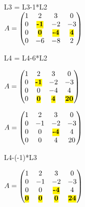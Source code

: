 \vspace{5mm} %

L3 = L3-1*L2 \\

$
A =
\begin{pmatrix}
  1 & 2 & 3 & 0    \\
  0 & \hl{\textbf{-1}} & -2 & -3 \\
  0 & \hl{\textbf{0}} & \hl{\textbf{-4}} & \hl{\textbf{4}}   \\
  0 & -6 & -8 & 2  \\
\end{pmatrix}
$

\vspace{5mm} %

L4 = L4-6*L2 \\

\vspace{5mm} %

$
A =
\begin{pmatrix}
  1 & 2 & 3 & 0    \\
  0 & \hl{\textbf{-1}} & -2 & -3 \\
  0 & 0 & -4 & 4   \\
  0 & \hl{\textbf{0}} & \hl{\textbf{4}} & \hl{\textbf{20}}   \\
\end{pmatrix}
$

\vspace{5mm} %

$
A =
\begin{pmatrix}
  1 & 2 & 3 & 0    \\
  0 & -1 & -2 & -3 \\
  0 & 0 & \hl{\textbf{-4}} & 4   \\
  0 & 0 & 4 & 20  \\
\end{pmatrix}
$

\vspace{5mm} %

L4-(-1)*L3\\

\vspace{5mm} %

$
A =
\begin{pmatrix}
  1 & 2 & 3 & 0    \\
  0 & -1 & -2 & -3 \\
  0 & 0 & \hl{\textbf{-4}} & 4   \\
  \hl{\textbf{0}} & \hl{\textbf{0}} & \hl{\textbf{0}} & \hl{\textbf{24}}  \\
\end{pmatrix}
$

